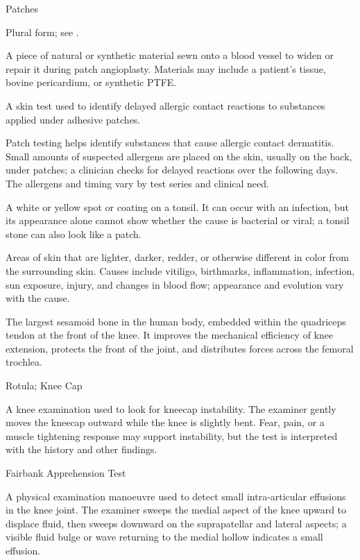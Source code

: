 \synonyms
Patches

 Plural form; see .

 A piece of natural or synthetic material sewn onto a blood vessel to widen or repair it during patch angioplasty. Materials may include a patient's tissue, bovine pericardium, or synthetic PTFE.

 A skin test used to identify delayed allergic contact reactions to substances applied under adhesive patches.

 Patch testing helps identify substances that cause allergic contact dermatitis. Small amounts of suspected allergens are placed on the skin, usually on the back, under patches; a clinician checks for delayed reactions over the following days. The allergens and timing vary by test series and clinical need.

 A white or yellow spot or coating on a tonsil. It can occur with an infection, but its appearance alone cannot show whether the cause is bacterial or viral; a tonsil stone can also look like a patch.

 Areas of skin that are lighter, darker, redder, or otherwise different in color from the surrounding skin. Causes include vitiligo, birthmarks, inflammation, infection, sun exposure, injury, and changes in blood flow; appearance and evolution vary with the cause.

 The largest sesamoid bone in the human body, embedded within the quadriceps tendon
at the front of the knee. It improves the mechanical efficiency of knee extension, protects
the front of the joint, and distributes forces across the femoral trochlea.

\synonyms
Rotula; Knee Cap

 A knee examination used to look for kneecap instability. The examiner gently moves the kneecap outward while the knee is slightly bent. Fear, pain, or a muscle tightening response may support instability, but the test is interpreted with the history and other findings.

\synonyms
Fairbank Apprehension Test

 A physical examination manoeuvre used to detect small intra-articular effusions in the knee joint. The examiner sweeps the medial aspect of the knee upward to displace fluid, then sweeps downward on the suprapatellar and lateral aspects; a visible fluid bulge or wave returning to the medial hollow indicates a small effusion.

